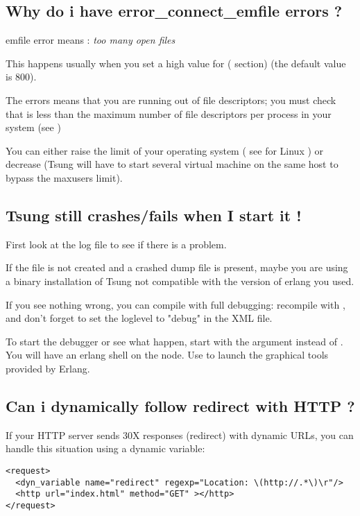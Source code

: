\documentclass{IDXDOC-en}
\begin{document}
\begin{appendix}
\subsection{Why do i have error\_connect\_emfile errors ?}
\label{sec:faq:emfile}
emfile error means : \emph{too many open files}

This happens usually when you set a high value for 
( section) (the default value is 800).


The errors means that you are running out of file descriptors; you
must check that  is less than the maximum number of
file descriptors per process in your system (see )

You can either raise the limit of your operating system ( see
 for Linux ) or decrease 
(Tsung will have to start several virtual machine on the same host to
bypass the maxusers limit).

\subsection{Tsung still crashes/fails  when I start it !}
First look at the log file
 to see
if there is a problem.

If the file is not created and a crashed dump file is present, maybe
you are using a binary installation of Tsung not compatible with the
version of erlang you used.

If you see nothing wrong, you can compile  with full
debugging: recompile with  , and
don't forget to set the loglevel to "debug" in the XML file.

To start the debugger or see what happen, start  with the
 argument instead of . You will have
an erlang shell on the  node. Use
 to launch the graphical tools provided by
Erlang.

\subsection{Can i dynamically follow redirect with HTTP ?}

If your HTTP server sends 30X responses (redirect) with dynamic URLs,
you can handle this situation using a dynamic variable:

\begin{Verbatim}
<request>
  <dyn_variable name="redirect" regexp="Location: \(http://.*\)\r"/>
  <http url="index.html" method="GET" ></http>
</request>


\end{Verbatim}
\end{appendix}
\end{document}
